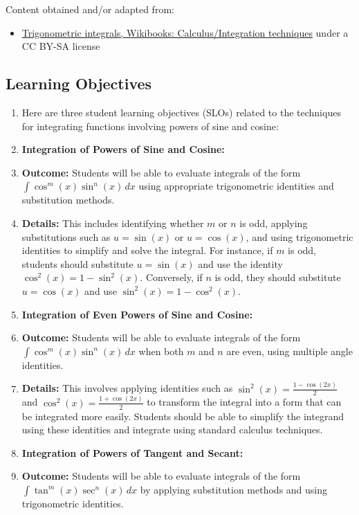 Content obtained and/or adapted from:


\begin{itemize}
    \item \href{https://en.wikibooks.org/wiki/Calculus/Integration_techniques/Trigonometric_Integrals}{Trigonometric integrals, Wikibooks: Calculus/Integration techniques} under a CC BY-SA license
\end{itemize}

\subsection{Learning Objectives}

\begin{enumerate}
    \item Here are three student learning objectives (SLOs) related to the techniques for integrating functions involving powers of sine and cosine:
    \item \textbf{Integration of Powers of Sine and Cosine:}
    \item \textbf{Outcome:} Students will be able to evaluate integrals of the form $\int \cos^m(x) \sin^n(x) \, dx$ using appropriate trigonometric identities and substitution methods.
    \item \textbf{Details:} This includes identifying whether $m$ or $n$ is odd, applying substitutions such as $u = \sin(x)$ or $u = \cos(x)$, and using trigonometric identities to simplify and solve the integral. For instance, if $m$ is odd, students should substitute $u = \sin(x)$ and use the identity $\cos^2(x) = 1 - \sin^2(x)$. Conversely, if $n$ is odd, they should substitute $u = \cos(x)$ and use $\sin^2(x) = 1 - \cos^2(x)$.
    \item \textbf{Integration of Even Powers of Sine and Cosine:}
    \item \textbf{Outcome:} Students will be able to evaluate integrals of the form $\int \cos^m(x) \sin^n(x) \, dx$ when both $m$ and $n$ are even, using multiple angle identities.
    \item \textbf{Details:} This involves applying identities such as $\sin^2(x) = \frac{1 - \cos(2x)}{2}$ and $\cos^2(x) = \frac{1 + \cos(2x)}{2}$ to transform the integral into a form that can be integrated more easily. Students should be able to simplify the integrand using these identities and integrate using standard calculus techniques.
    \item \textbf{Integration of Powers of Tangent and Secant:}
    \item \textbf{Outcome:} Students will be able to evaluate integrals of the form $\int \tan^m(x) \sec^n(x) \, dx$ by applying substitution methods and using trigonometric identities.

\end{enumerate}
